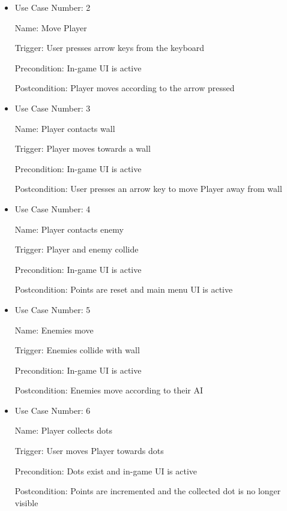 \documentclass[12pt, titlepage]{article}
\begin{document}
\begin{itemize}
\item
Use Case Number: 2

Name: Move Player

Trigger: User presses arrow keys from the keyboard

Precondition: In-game UI is active

Postcondition: Player moves according to the arrow pressed
\end{itemize}

\begin{itemize}
\item
Use Case Number: 3

Name: Player contacts wall

Trigger: Player moves towards a wall

Precondition: In-game UI is active

Postcondition: User presses an arrow key to move Player away from wall

\end{itemize}

\begin{itemize}
\item
Use Case Number: 4

Name: Player contacts enemy

Trigger: Player and enemy collide

Precondition: In-game UI is active

Postcondition: Points are reset and main menu UI is active
\end{itemize}

\begin{itemize}
\item
Use Case Number: 5

Name: Enemies move

Trigger: Enemies collide with wall

Precondition: In-game UI is active

Postcondition: Enemies move according to their AI
\end{itemize}

\begin{itemize}
\item
Use Case Number: 6

Name: Player collects dots

Trigger: User moves Player towards dots

Precondition: Dots exist and in-game UI is active

Postcondition: Points are incremented and the collected dot is no longer visible
\end{itemize}
\end{document}
